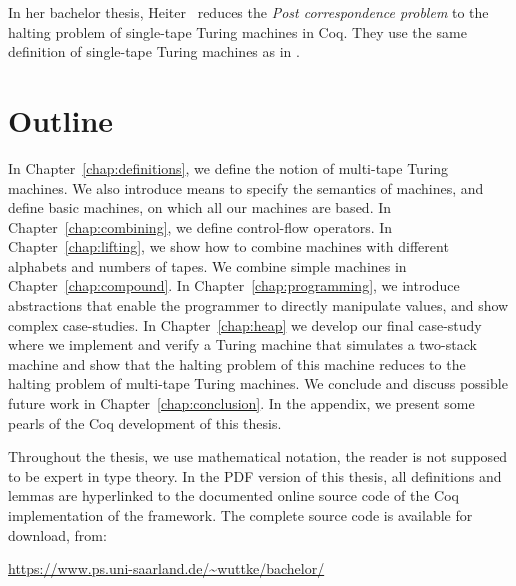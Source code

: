 In her bachelor thesis, Heiter~\cite{Heiter} reduces the \textit{Post correspondence problem} to the halting problem of single-tape Turing machines in
Coq.  They use the same definition of single-tape Turing machines as in \cite{asperti2012}.



\section{Outline}
\label{sec:outline}

In Chapter~\ref{chap:definitions}, we define the notion of multi-tape Turing machines.  We also introduce means to specify the semantics of machines,
and define basic machines, on which all our machines are based.  In Chapter~\ref{chap:combining}, we define control-flow operators.  In
Chapter~\ref{chap:lifting}, we show how to combine machines with different alphabets and numbers of tapes.  We combine simple machines in
Chapter~\ref{chap:compound}.  In Chapter~\ref{chap:programming}, we introduce abstractions that enable the programmer to directly manipulate values,
and show complex case-studies.  In Chapter~\ref{chap:heap} we develop our final case-study where we implement and verify a Turing machine that
simulates a two-stack machine and show that the halting problem of this machine reduces to the halting problem of multi-tape Turing machines.  We
conclude and discuss possible future work in Chapter~\ref{chap:conclusion}.  In the appendix, we present some pearls of the Coq development of this
thesis.

Throughout the thesis, we use mathematical notation, the reader is not supposed to be expert in type theory.  In the PDF version of this thesis, all
definitions and lemmas are hyperlinked to the documented online source code of the Coq implementation of the framework.  The complete source code is
available for download, from:
\begin{center}
  \url{https://www.ps.uni-saarland.de/~wuttke/bachelor/}
\end{center}

